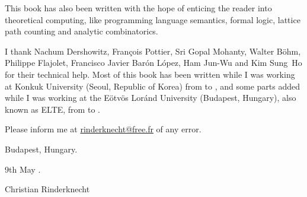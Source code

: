 This book has also been written with the hope of enticing the reader
into theoretical computing, like programming language semantics,
formal logic, lattice path counting and analytic combinatorics.

I thank Nachum Dershowitz, Fran\c{c}ois Pottier, Sri Gopal Mohanty,
Walter B\"ohm, Philippe Flajolet, Francisco Javier Bar\'on L\'opez,
Ham Jun-Wu and Kim Sung~Ho for their technical help. Most of this book
has been written while I was working at Konkuk University (Seoul,
Republic of Korea) from  to ,
and some parts added while I was working at the E\"otv\"os Lor\'and
University (Budapest, Hungary), also known as ELTE, from
 to .

Please inform me at \url{rinderknecht@free.fr} of any error.

\bigskip

\hfill{}Budapest, Hungary.


\hfill{}9th May .

\bigskip

\hfill{}Christian Rinderknecht
